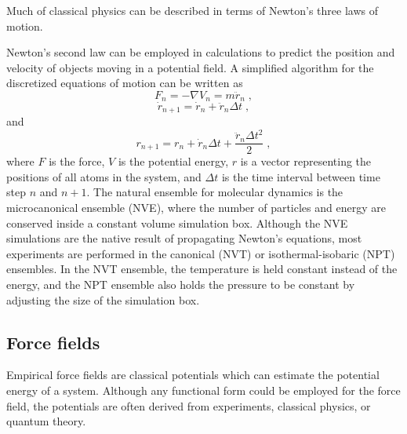 \documentclass[12pt]{report}
\begin{document}
Much of classical physics can be described in terms of Newton's three laws of
motion.
\begin{quote} 
\end{quote}
Newton's second law can be employed in calculations to predict the position
and velocity of objects moving in a potential field. A simplified algorithm
for the discretized equations of motion can be written as
\begin{equation}
 F_{n} = -\nabla V_{n} = m\ddot r_{n} \; ,
\end{equation}
\begin{equation}
 \dot r_{n+1} = \dot r_{n}+\ddot r_{n}\Delta t \; ,
\end{equation}
and
\begin{equation}
 r_{n+1} = r_{n}+\dot r_{n}\Delta t+\frac{\ddot r_{n}\Delta t^2}{2} \; ,
\end{equation}
where $F$ is the force, $V$ is the potential energy, $r$ is a vector
representing the positions of all atoms in the system, and $\Delta t$ is the
time interval between time step $n$ and $n+1$. The natural ensemble for
molecular dynamics is the microcanonical ensemble (NVE), where the number of
particles and energy are conserved inside a constant volume simulation box.
Although the NVE simulations are the native result of propagating Newton's
equations, most experiments are performed in the canonical (NVT) or
isothermal-isobaric (NPT) ensembles. In the NVT ensemble, the temperature is
held constant instead of the energy, and the NPT ensemble also holds the
pressure to be constant by adjusting the size of the simulation box.

\subsection{Force fields}

Empirical force fields are classical potentials which can estimate the
potential energy of a system. Although any functional form could be employed
for the force field, the potentials are often derived from experiments,
classical physics, or quantum theory. \\
\end{document}
